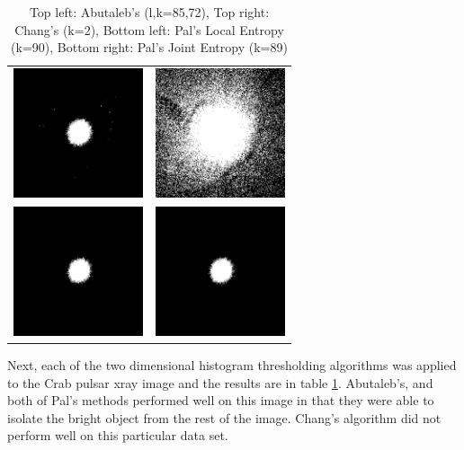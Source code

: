 \documentclass[journal]{IEEEtran}
\begin{document}
\begin{table}[!h]
\centering
\begin{tabular}{cc}
\includegraphics[width=1.5in]{../results/crabpulsar-xray_abutaleb.png} &
\includegraphics[width=1.5in]{../results/crabpulsar-xray_chang.png} \\
\newline
\includegraphics[width=1.5in]{../results/crabpulsar-xray_le_pal.png} &
\includegraphics[width=1.5in]{../results/crabpulsar-xray_je_pal.png} \\
\end{tabular}
\caption{Top left: Abutaleb's (l,k=85,72), Top right: Chang's (k=2), Bottom left: Pal's Local Entropy (k=90), Bottom right: Pal's Joint Entropy (k=89)}
\label{tab:xrayTable2}
\end{table}

\par Next, each of the two dimensional histogram thresholding algorithms was applied to the Crab pulsar xray image and the results are in table \ref{tab:xrayTable2}. Abutaleb's, and both of Pal's methods performed well on this image in that they were able to isolate the bright object from the rest of the image. Chang's algorithm did not perform well on this particular data set.
\end{document}
